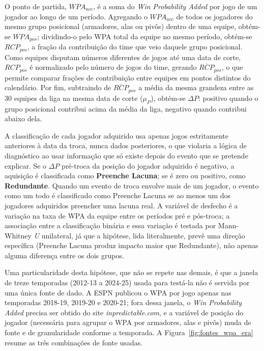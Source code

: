 O ponto de partida, $WPA_{acc}$, é a soma do \textit{Win Probability Added} por jogo de um jogador ao longo de um período. Agregando o $WPA_{acc}$ de todos os jogadores do mesmo grupo posicional (armadores, alas ou pivôs) dentro de uma equipe, obtém-se $WPA_{pos}$; dividindo-o pelo WPA total da equipe no mesmo período, obtém-se $RCP_{pos}$, a fração da contribuição do time que veio daquele grupo posicional. Como equipes disputam números diferentes de jogos até uma data de corte, $RCP_{pos}$ é normalizado pelo número de jogos do time, gerando $\overline{RCP}_{pos}$, o que permite comparar frações de contribuição entre equipes em pontos distintos do calendário. Por fim, subtraindo de $\overline{RCP}_{pos}$ a média da mesma grandeza entre as 30 equipes da liga na mesma data de corte ($\mu_P$), obtém-se $\Delta P$: positivo quando o grupo posicional contribui acima da média da liga, negativo quando contribui abaixo dela.

A classificação de cada jogador adquirido usa apenas jogos estritamente anteriores à data da troca, nunca dados posteriores, o que violaria a lógica de diagnóstico ao usar informação que só existe depois do evento que se pretende explicar. Se o $\Delta P$ pré-troca da posição do jogador adquirido é negativo, a aquisição é classificada como \textbf{Preenche Lacuna}; se é zero ou positivo, como \textbf{Redundante}. Quando um evento de troca envolve mais de um jogador, o evento como um todo é classificado como Preenche Lacuna se ao menos um dos jogadores adquiridos preencher uma lacuna real. A variável de desfecho é a variação na taxa de WPA da equipe entre os períodos pré e pós-troca; a associação entre a classificação binária e essa variação é testada por Mann-Whitney \textit{U} unilateral, já que a hipótese, lida literalmente, prevê uma direção específica (Preenche Lacuna produz impacto maior que Redundante), não apenas alguma diferença entre os dois grupos.

Uma particularidade desta hipótese, que não se repete nas demais, é que a janela de treze temporadas (2012-13 a 2024-25) usada para testá-la não é servida por uma única fonte de dado. A ESPN publicou o WPA por jogo apenas nas temporadas 2018-19, 2019-20 e 2020-21; fora dessa janela, o \textit{Win Probability Added} precisa ser obtido do site \textit{inpredictable.com}, e a variável de posição do jogador (necessária para agrupar o WPA por armadores, alas e pivôs) muda de fonte e de granularidade conforme a temporada. A Figura~\ref{fig:fontes_wpa_era} resume as três combinações de fonte usadas.

